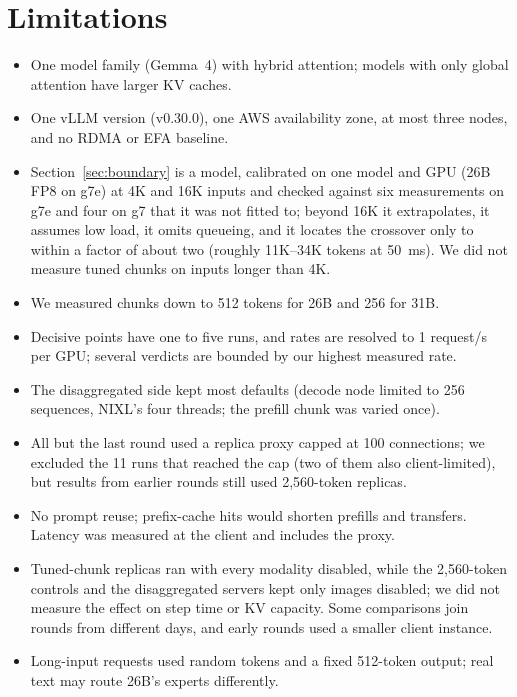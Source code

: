 \documentclass[11pt]{article}
\begin{document}
\section{Limitations}
\begin{itemize}
  \item One model family (Gemma~4) with hybrid attention; models with only global attention have larger KV caches.
  \item One vLLM version (v0.30.0), one AWS availability zone, at most three nodes, and no RDMA or EFA baseline.
  \item Section~\ref{sec:boundary} is a model, calibrated on one model and GPU (26B FP8 on g7e) at 4K and 16K inputs and checked against six measurements on g7e and four on g7 that it was not fitted to; beyond 16K it extrapolates, it assumes low load, it omits queueing, and it locates the crossover only to within a factor of about two (roughly 11K--34K tokens at 50~ms). We did not measure tuned chunks on inputs longer than 4K.
  \item We measured chunks down to 512 tokens for 26B and 256 for 31B.
  \item Decisive points have one to five runs, and rates are resolved to 1 request/s per GPU; several verdicts are bounded by our highest measured rate.
  \item The disaggregated side kept most defaults (decode node limited to 256 sequences, NIXL's four threads; the prefill chunk was varied once).
  \item All but the last round used a replica proxy capped at 100 connections; we excluded the 11 runs that reached the cap (two of them also client-limited), but results from earlier rounds still used 2,560-token replicas.
  \item No prompt reuse; prefix-cache hits would shorten prefills and transfers. Latency was measured at the client and includes the proxy.
  \item Tuned-chunk replicas ran with every modality disabled, while the 2,560-token controls and the disaggregated servers kept only images disabled; we did not measure the effect on step time or KV capacity. Some comparisons join rounds from different days, and early rounds used a smaller client instance.
  \item Long-input requests used random tokens and a fixed 512-token output; real text may route 26B's experts differently.
\end{itemize}
\end{document}
